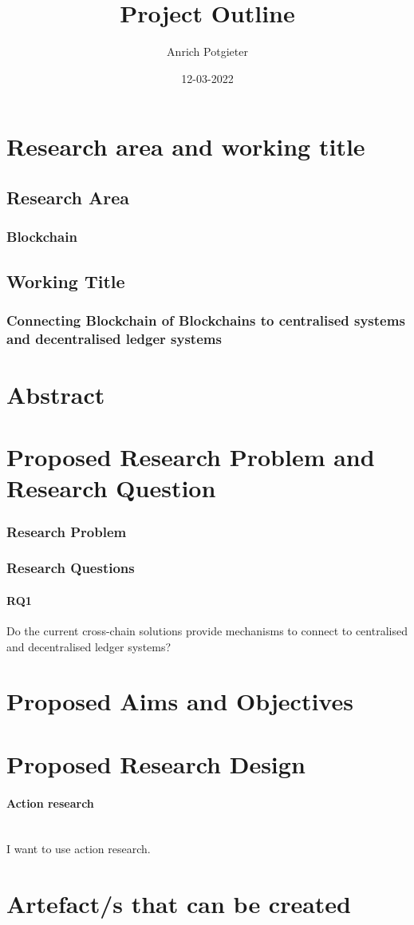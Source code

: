 \documentclass[12pt]{article}
\title{Project Outline}
\author{Anrich Potgieter}
\date{12-03-2022}
\begin{document}
\maketitle
\tableofcontents

\section{Research area and working title}
\subsection{Research Area}
\subsubsection{Blockchain}

\subsection{Working Title}
\subsubsection{Connecting Blockchain of Blockchains to centralised systems and decentralised ledger systems}

\section{Abstract}

\section{Proposed Research Problem and Research Question}
\subsubsection{Research Problem}

\subsubsection{Research Questions}
\paragraph{RQ1} Do the current cross-chain solutions provide mechanisms to connect to centralised and decentralised ledger systems?

\section{Proposed Aims and Objectives}

\section{Proposed Research Design}
\paragraph{Action research}\mbox{} \\
I want to use action research.
\section{Artefact/s that can be created}

\printbibliography
\end{document}
